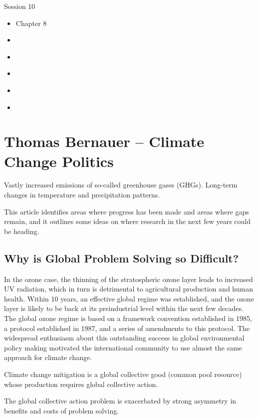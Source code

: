 Session 10
\begin{itemize}
    \item [***] \textcite{buenodemesquitaPrinciplesInternationalPolitics2013}{Chapter 8}
    \item \textcite{bernauerClimateChangePolitics2013}
    \item \textcite{rogerComparativePoliticsTransnational2017}
    \item \textcite{aklinPrisonersWrongDilemma2020}
    \item \textcite{dietzStruggleGovernCommons}
    \item \textcite{bechtelInterestsNormsSupport2019}
\end{itemize}

\section{Thomas Bernauer -- Climate Change Politics}

Vastly increased emissions of so-called greenhouse gases (GHGs). Long-term changes in temperature and precipitation patterns.

This article identifies areas where progress has been made and areas where gaps remain, and it outlines some ideas on where research in the next few years could be heading.

\subsection{Why is Global Problem Solving so Difficult?}

In the ozone case, the thinning of the stratospheric ozone layer leads to increased UV radiation, which in turn is detrimental to agricultural production and human health. Within 10 years, an effective global regime was established, and the ozone layer is likely to be back at its preindustrial level within the next few decades. The global ozone regime is based on a framework convention established in 1985, a protocol established in 1987, and a series of amendments to this protocol. The widespread enthusiasm about this outstanding success in global environmental policy making motivated the international community to use almost the same approach for climate change.

Climate change mitigation is a global collective good (common pool resource) whose production requires global collective action.

The global collective action problem is exacerbated by strong asymmetry in benefits and costs of problem solving.


